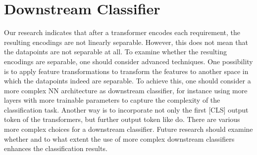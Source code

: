 \section{Downstream Classifier}
\label{chp:future_work:sec:downstream_classifier}
Our research indicates that after a transformer encodes each requirement, the resulting encodings are not linearly separable.
However, this does not mean that the datapoints are not separable at all.
To examine whether the resulting encodings are separable, one should consider advanced techniques.
One possibility is to apply feature transformations to transform the features to another space in which the datapoints indeed are separable.
To achieve this, one should consider a more complex \ac{NN} architecture as downstream classifier, for instance using more layers with more trainable parameters to capture the complexity of the classification task.
Another way is to incorporate not only the first [CLS] output token of the transformers, but further output token like \textcite{Gao:2019} do.
There are various more complex choices for a downstream classifier.
Future research should examine whether and to what extent the use of more complex downstream classifiers enhances the classification results.
